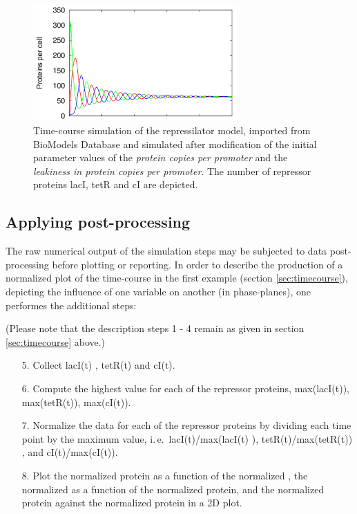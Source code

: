 \begin{figure}[ht]
	\centering
	\includegraphics[width=0.7\textwidth]{examples/rep_pre.png}
	\caption{Time-course simulation of the repressilator model, imported from BioModels Database and simulated after modification of the initial parameter values of the \emph{protein copies per promoter} and the \emph{leakiness in protein copies per promoter}. The number of repressor proteins lacI, tetR and cI are depicted.}
	\label{fig:rep_pre}
\end{figure}

\subsection{Applying post-processing}
\label{sec:postprocessing}
The raw numerical output of the simulation steps may be subjected to data post-processing before plotting or reporting. In order to describe the production of a normalized plot of the time-course in the first example (section \ref{sec:timecourse}), depicting the influence of one variable on another (in phase-planes), one performes the additional steps:

(Please note that the description steps 1 - 4 remain as given in section \ref{sec:timecourse} above.)
\begin{enumerate}
	\item[5.]{Collect lacI(t) , tetR(t) and cI(t).}
	\item[6.]{Compute the highest value for each of the repressor proteins, max(lacI(t)), max(tetR(t)), max(cI(t)).}
	\item[7.]{Normalize the data for each of the repressor proteins by dividing each time point by the maximum value, i.\,e.\ lacI(t)/max(lacI(t) ), tetR(t)/max(tetR(t)) , and cI(t)/max(cI(t)).}
	\item[8.]{Plot the normalized  protein as a function of the normalized , the normalized   as a function of the normalized  protein, and the normalized  protein against the normalized  protein in a 2D plot.}
\end{enumerate}

